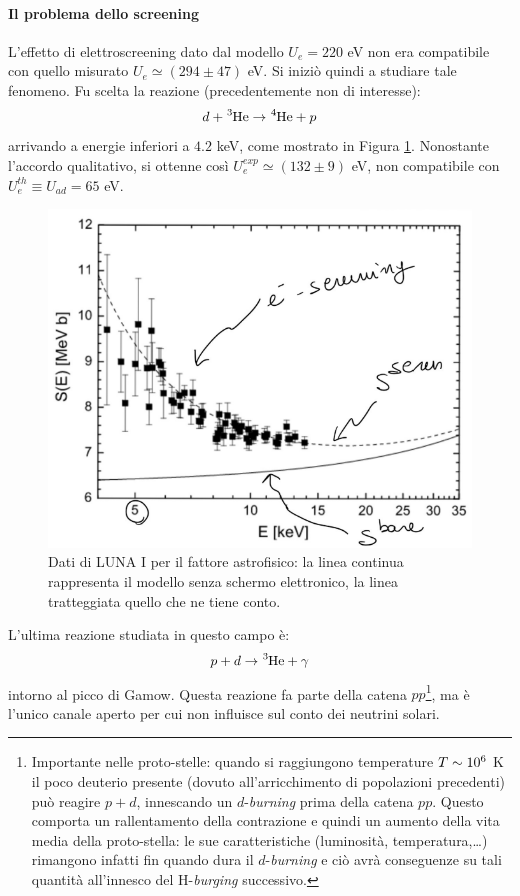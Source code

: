 \paragraph{Il problema dello screening} L'effetto di elettroscreening dato dal modello $U_e = 220$ eV non era compatibile con quello misurato $U_e\simeq (294 \pm 47)$ eV. Si iniziò quindi a studiare tale fenomeno. Fu scelta la reazione (precedentemente non di interesse):
$$d + \ce{^3He} \to \ce{^4He} + p$$
arrivando a energie inferiori a $4.2$ keV, come mostrato in Figura \ref{0415_escreen}. Nonostante l'accordo qualitativo, si ottenne così $U_e^{exp} \simeq (132\pm 9) $ eV, non compatibile con $U_e^{th}\equiv U_{ad} = 65$ eV.

\begin{figure}[!h]
	\centering
	\includegraphics[scale=0.7]{Immagini/0415_SE.png}
	\caption{Dati di LUNA I per il fattore astrofisico: la linea continua rappresenta il modello senza schermo elettronico, la linea tratteggiata quello che ne tiene conto.}
	\label{0415_escreen}
\end{figure}
\noindent L'ultima reazione studiata in questo campo è:
$$p + d \to \ce{^3He} + \gamma$$
intorno al picco di Gamow. Questa reazione fa parte della catena $pp$\footnote{Importante nelle proto-stelle: quando si raggiungono temperature $T\sim 10^{6}$ K il poco deuterio presente (dovuto all'arricchimento di popolazioni precedenti) può reagire $p+d$, innescando un $d$-\textit{burning} prima della catena $pp$. Questo comporta un rallentamento della contrazione e quindi un aumento della vita media della proto-stella: le sue caratteristiche (luminosità, temperatura,\dots) rimangono infatti  fin quando dura il $d$-\textit{burning} e ciò avrà conseguenze su tali quantità all'innesco del H-\textit{burging} successivo.}, ma è l'unico canale aperto per cui non influisce sul conto dei neutrini solari. 
